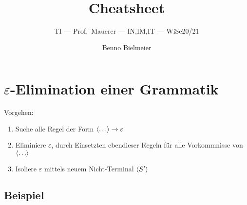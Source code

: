 \documentclass[a4paper,parskip=half,footsepline=on,headings=normal,titlepage=false]{scrartcl}
\title{Cheatsheet}
\subtitle{\acl{TI} --- Prof.~Mauerer --- IN,IM,IT --- \acs{WiSe}20/21}
\author{Benno Bielmeier}
\newcommand{\nt}[1]{\langle \uppercase{#1} \rangle}
\renewcommand{\epsilon}{\varepsilon}
\begin{document}

\begin{acronym}
\end{acronym}

\maketitle
\tableofcontents

\section{\texorpdfstring{$\epsilon$}{Epsilon}-Elimination einer Grammatik}
Vorgehen:
\begin{enumerate}[label=\alph*)]
    \item Suche alle Regel der Form {\color{c1}$\nt{\dots} \to \epsilon$}
    \item {\color{c2}Eliminiere $\epsilon$}, durch Einsetzten ebendieser Regeln für alle Vorkommnisse von \textcolor{c1}{$\nt{\dots}$}
    \item {\color{c3}Isoliere $\epsilon$} mittels neuem Nicht-Terminal \textcolor{c3}{$\nt{S'}$}
\end{enumerate}

\subsection*{Beispiel}
\end{document}
